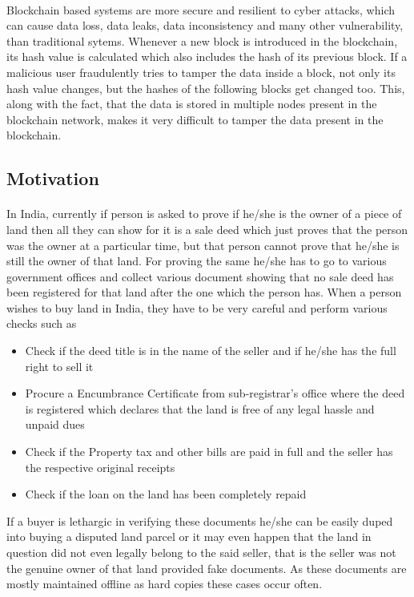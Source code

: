 \documentclass{article}
\begin{document}
        \paragraph{}
        Blockchain based systems are more secure and resilient to cyber attacks, which can cause data loss, data leaks, data inconsistency and many other vulnerability, than traditional sytems. Whenever a new block is introduced in the blockchain, its hash value is calculated which also includes the hash of its previous block. If a malicious user fraudulently tries to tamper the data inside a block, not only its hash value changes, but the hashes of the following blocks get changed too. This, along with the fact, that the data is stored in multiple nodes present in the blockchain network, makes it very difficult to tamper the data present in the blockchain.


        \paragraph{}
        
    \subsection{Motivation}
        \paragraph{}
        In India, currently if person is asked to prove if he/she is the owner of a piece of land then all they can show for it is a sale deed which just proves that the person was the owner at a particular time, but that person cannot prove that he/she is still the owner of that land. For proving the same he/she has to go to various government offices and collect various document showing that no sale deed has been registered for that land after the one which the person has. When a person wishes to buy land in India, they have to be very careful and perform various checks such as
        \begin{itemize}
            \item Check if the deed title is in the name of the seller and if he/she has the full right to sell it
            \item Procure a Encumbrance Certificate from sub-registrar's office where the deed is registered which declares that the land is free of any legal hassle and unpaid dues
            \item Check if the Property tax and other bills are paid in full and the seller has the respective original receipts
            \item Check if the loan on the land has been completely repaid
        \end{itemize}
        If a buyer is lethargic in verifying these documents he/she can be easily duped into buying a disputed land parcel or it may even happen that the land in question did not even legally belong to the said seller, that is the seller was not the genuine owner of that land provided fake documents. As these documents are mostly maintained offline as hard copies these cases occur often.
\end{document}
